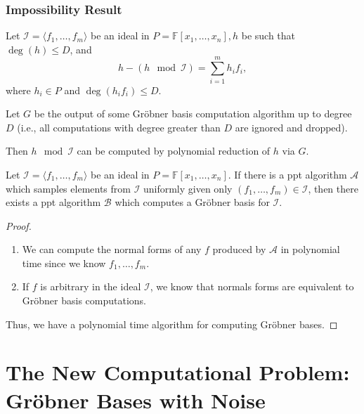 \documentclass[10pt]{beamer}
\newcommand{\ideal}[1]{\langle {#1} \rangle}
\newcommand{\field}[1]{\mathbb{#1}}
\newcommand{\F}{\field{F}}
\newcommand{\FX}{\ensuremath{{{\F}[x_1,\dots,x_n]}}}
\newcommand{\sys}{\ensuremath{f_1,\dots,f_m}\xspace}
\newcommand{\A}{\ensuremath{\mathcal{A}}\xspace}
\newcommand{\B}{\ensuremath{\mathcal{B}}\xspace}
\newcommand{\I}{\ensuremath{\mathcal{I}}\xspace}
\begin{document}
\begin{frame}[allowframebreaks]
\frametitle{Impossibility Result} 
\begin{theorem}
\label{theorem:dfgs}
Let $\I = \ideal{f_1,\dots, f_m}$ be an ideal in $P = \FX, h$ be such that $\deg(h) \leq D$, and $$h - (h \mod \I) = \sum_{i=1}^{m}h_if_i,$$ where $h_i \in P$ and $\deg(h_i f_i ) \leq D$. 

\vspace{1em}

Let $G$ be the output of some Gr\"obner basis computation algorithm up to degree $D$ (i.e., all computations with degree greater than $D$ are ignored and dropped). 

\vspace{1em}

Then $h \mod \I$ can be computed by polynomial reduction of $h$ via $G$.
\end{theorem}

\framebreak

\begin{theorem}
\label{theorem:gbeasy}
Let $\I = \ideal{\sys}$ be an ideal in $P = \FX$. If there is a ppt algorithm \A which samples elements from $\I$ uniformly given only $(\sys) \in \I$, then there exists a ppt algorithm $\B$ which computes a Gröbner basis for $\I$.
\end{theorem}

\begin{proof}
\begin{enumerate}
 \item We can compute the normal forms of any $f$ produced by \A in polynomial time since we know $\sys$.
 \item If $f$ is arbitrary in the ideal $\I$, we know that normals forms are equivalent to Gröbner basis computations.
\end{enumerate}
Thus, we have a polynomial time algorithm for computing Gröbner bases.
\end{proof}
\end{frame}



\section{The New Computational Problem: Gröbner Bases with Noise}
\end{document}
